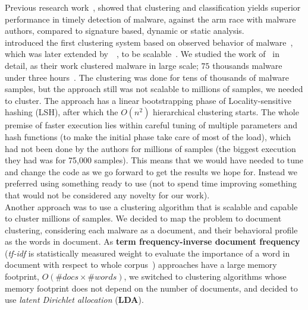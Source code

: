 Previous research work~\cite[]{bailey,bayer,rieck2009automatic}, showed that clustering and classification yields superior performance in timely detection of malware, against the arm race with malware authors, compared to signature based, dynamic or static analysis.
\\
\citeauthor{bailey} introduced the first clustering system based on observed behavior of malware~\cite[]{bailey}, which was later extended by~\citeauthor{bayer}~\cite[]{bayer}, to be scalable~\cite[]{rieck2009automatic}.
We studied the work of~\citeauthor{bayer} in detail, as their work clustered malware in large scale; $75$ thousands malware under three hours~\cite[]{bayer}.
The clustering was done for tens of thousands of malware samples, but the approach still was not scalable to millions of samples, we needed to cluster.
The approach has a linear bootstrapping phase of Locality-sensitive hashing (LSH), after which the $O(n^2)$ hierarchical clustering starts.
The whole premise of faster execution lies within careful tuning of multiple parameters and hash functions (to make the initial phase take care of most of the load), which had not been done by the authors for millions of samples (the biggest execution they had was for 75,000 samples).
This means that we would have needed to tune and change the code as we go forward to get the results we hope for.
Instead we preferred using something ready to use (not to spend time improving something that would not be considered any novelty for our work).
\\
Another approach was to use a clustering algorithm that is scalable and capable to cluster millions of samples.
We decided to map the problem to document clustering, considering each malware as a document, and their behavioral profile as the words in document.
As \textbf{term frequency-inverse document frequency} (\emph{tf-idf} is statistically measured weight to evaluate the importance of a word in document with respect to whole corpus~\cite[]{tfidf}) approaches have a large memory footprint, $O(\#docs \times \#words)$, we switched to clustering algorithms whose memory footprint does not depend on the number of documents, and decided to use \textit{latent Dirichlet allocation} (\textbf{LDA}).

